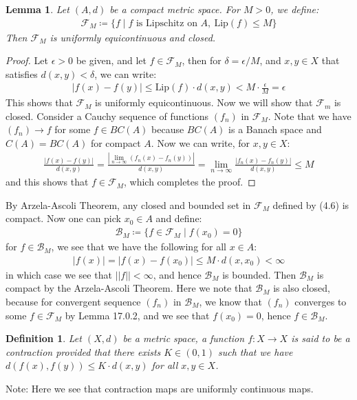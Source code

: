 \documentclass[11pt]{book}
\theoremstyle{break}
\theoremstyle{break}
\newtheorem{lem}{Lemma}[thm]
\newtheorem{defn}{Definition}[corL]
\newcommand{\F}{\mathcal{F}}
\newcommand{\note}{\color{red}Note: \color{black}}
\begin{document}
\begin{lem}
Let $(A,d)$ be a compact metric space. For $M > 0$, we define:
\begin{align}
\F_M \coloneqq \{ f \mid f \text{ is Lipschitz on }A, \ \text{Lip}(f) \leq M\}
\end{align}
Then $\F_M$ is uniformly equicontinuous and closed. 
\end{lem}
\begin{proof}
Let $\epsilon>0$ be given, and let $f \in \F_M$, then for $\delta = \epsilon/M$, and $x,y \in X$ that satisfies $d(x,y) < \delta$, we can write:
\begin{align*}
|f(x) - f(y)| \leq \text{Lip}(f) \cdot d(x,y) < M \cdot  \frac{\epsilon}{M} = \epsilon
\end{align*}
This shows that $\F_M$ is uniformly equicontinuous. Now we will show that $\F_m$ is closed. Consider a Cauchy sequence of functions $(f_n) $ in $\F_M$. Note that we have $(f_n) \to f$ for some $f \in BC(A)$ because $ BC(A)$ is a Banach space and $C(A) = BC(A)$ for compact $A$. Now we can write, for $x,y \in X$:
\begin{align*}
\frac{|f(x) - f(y)|}{d(x,y)} = \frac{|\lim_{n\to \infty} (f_n(x) - f_n(y))|}{d(x,y)} = \lim_{n\to \infty}\frac{|f_n(x) - f_n(y)|}{d(x,y)} \leq M
\end{align*}
and this shows that $f \in \F_M$, which completes the proof. 
\end{proof}

By Arzela-Ascoli Theorem, any closed and bounded set in $\F_M$ defined by (4.6) is compact. Now one can pick $x_0 \in A$ and define:
\begin{align*}
\mathcal{B}_M \coloneqq \{ f \in \F_M \mid f(x_0) = 0\}
\end{align*}
for $f \in \mathcal{B}_M$, we see that we have the following for all $x \in A$:
\begin{align*}
|f(x) | = |f(x) - f(x_0)| \leq M \cdot d(x,x_0) < \infty
\end{align*}
in which case we see that $||f|| < \infty$, and hence $\mathcal{B}_M$ is bounded. Then $\mathcal{B}_M$ is compact by the Arzela-Ascoli Theorem. Here we note that $\mathcal{B}_M$ is also closed, because for convergent sequence $(f_n)$ in $\mathcal{B}_M$, we know that $(f_n)$ converges to some $f \in \mathcal{F}_M$ by Lemma 17.0.2, and we see that $f(x_0) = 0$, hence $f \in \mathcal{B}_M$. \\


\begin{defn}
Let $(X,d)$ be a metric space, a function $f:X \to X$ is said to be a contraction provided that there exists $K \in (0,1)$ such that we have $
d(f(x),f(y) ) \leq K \cdot d(x,y) $ for all $x,y \in X$. 
\end{defn}
\note Here we see that contraction maps are uniformly continuous maps. 
\end{document}
